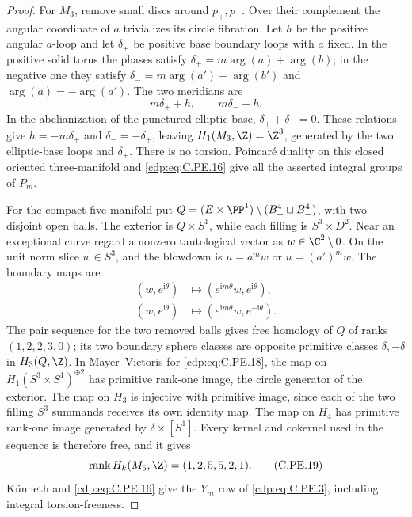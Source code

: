 \begin{proof}
For $M_3$, remove small discs around $p_+,p_-$.
Over their complement the angular coordinate of
$a$ trivializes its circle fibration. Let $h$ be
the positive angular $a$-loop and let $\delta_\pm$
be positive base boundary loops with $a$ fixed.
In the positive solid torus the phases satisfy
$\delta_+=m\arg(a)+\arg(b)$; in the negative one
they satisfy $\delta_-=m\arg(a')+\arg(b')$ and
$\arg(a)=-\arg(a')$. The two meridians are
\[
                         m\delta_++h,\qquad
                         m\delta_- -h.                 \tag{C.PE.17}\label{cdp:eq:C.PE.17}
\]
In the abelianization of the punctured elliptic base,
$\delta_++\delta_-=0$. These relations give
$h=-m\delta_+$ and $\delta_-=-\delta_+$, leaving
$H_1(M_3,\Z)=\Z^3$, generated by the two
elliptic-base loops and $\delta_+$. There is no
torsion. Poincar\'e duality on this closed oriented
three-manifold and \eqref{cdp:eq:C.PE.16} give all the asserted
integral groups of $P_m$.

For the compact five-manifold put
$Q=(E\times\PP^1)\setminus(B^4_+\sqcup B^4_-)$,
with two disjoint open balls. The exterior is
$Q\times S^1$, while each filling is
$S^3\times D^2$. Near an exceptional curve regard
a nonzero tautological vector as
$w\in\C^2\setminus0$. On the unit norm slice
$w\in S^3$, and the blowdown is
$u=a^m w$ or $u=(a')^m w$. The boundary maps are
\[
 \begin{split}
 (w,e^{\mathrm i\theta})&\longmapsto
       (e^{\mathrm i m\theta}w,e^{\mathrm i\theta}),\\
 (w,e^{\mathrm i\theta})&\longmapsto
       (e^{\mathrm i m\theta}w,e^{-\mathrm i\theta}).
 \end{split}                                             \tag{C.PE.18}\label{cdp:eq:C.PE.18}
\]
The pair sequence for the two removed balls gives
free homology of $Q$ of ranks $(1,2,2,3,0)$; its
two boundary sphere classes are opposite
primitive classes $\delta,-\delta$ in $H_3(Q,\Z)$.
In Mayer--Vietoris for \eqref{cdp:eq:C.PE.18}, the map on
$H_1(S^3\times S^1)^{\oplus2}$ has primitive
rank-one image, the circle generator of the
exterior. The map on $H_3$ is injective with
primitive image, since each of the two filling
$S^3$ summands receives its own identity map.
The map on $H_4$ has primitive rank-one image
generated by $\delta\times[S^1]$. Every kernel
and cokernel used in the sequence is therefore
free, and it gives
\[
       \operatorname{rank}H_k(M_5,\Z)=(1,2,5,5,2,1).
                                                               \tag{C.PE.19}\label{cdp:eq:C.PE.19}
\]
K\"unneth and \eqref{cdp:eq:C.PE.16} give the $Y_m$ row of
\eqref{cdp:eq:C.PE.3}, including integral torsion-freeness.


\end{proof}
